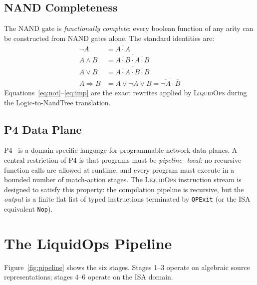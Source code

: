 \documentclass[sigconf,natbib=false]{acmart}
\begin{document}
\subsection{NAND Completeness}

The NAND gate is \emph{functionally complete}: every boolean function of any
arity can be constructed from NAND gates alone. The standard identities are:
\begin{align}
  \lnot A &= \overline{A \cdot A} \label{eq:not}\\
  A \land B &= \overline{\overline{A \cdot B} \cdot \overline{A \cdot B}} \label{eq:and}\\
  A \lor B &= \overline{\overline{A \cdot A} \cdot \overline{B \cdot B}} \label{eq:or}\\
  A \Rightarrow B &= A \lor \lnot A \lor B = \overline{\overline{\lnot A} \cdot \overline{B}} \label{eq:imp}
\end{align}
Equations~\eqref{eq:not}--\eqref{eq:imp} are the exact rewrites applied by
\textsc{LiquidOps} during the Logic-to-NandTree translation.

\subsection{P4 Data Plane}

P4~\cite{bosshart2014p4} is a domain-specific language for programmable network
data planes. A central restriction of P4 is that programs must be \emph{pipeline-
local}: no recursive function calls are allowed at runtime, and every program
must execute in a bounded number of match-action stages. The \textsc{LiquidOps}
instruction stream is designed to satisfy this property: the compilation pipeline
is recursive, but the \emph{output} is a finite flat list of typed instructions
terminated by \texttt{OPExit} (or the ISA equivalent \texttt{Nop}).


\section{The LiquidOps Pipeline}
\label{sec:pipeline}

Figure~\ref{fig:pipeline} shows the six stages. Stages 1--3 operate on
algebraic source representations; stages 4--6 operate on the ISA domain.
\end{document}
